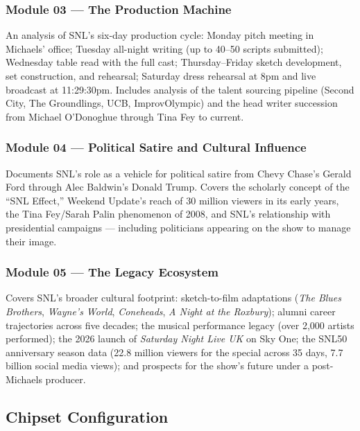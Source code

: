 \documentclass[11pt,letterpaper]{article}
\begin{document}
\subsubsection{Module 03 --- The Production Machine}
An analysis of SNL's six-day production cycle: Monday pitch meeting in Michaels' office; Tuesday all-night writing (up to 40--50 scripts submitted); Wednesday table read with the full cast; Thursday--Friday sketch development, set construction, and rehearsal; Saturday dress rehearsal at 8pm and live broadcast at 11:29:30pm. Includes analysis of the talent sourcing pipeline (Second City, The Groundlings, UCB, ImprovOlympic) and the head writer succession from Michael O'Donoghue through Tina Fey to current.

\subsubsection{Module 04 --- Political Satire and Cultural Influence}
Documents SNL's role as a vehicle for political satire from Chevy Chase's Gerald Ford through Alec Baldwin's Donald Trump. Covers the scholarly concept of the ``SNL Effect,'' Weekend Update's reach of 30 million viewers in its early years, the Tina Fey/Sarah Palin phenomenon of 2008, and SNL's relationship with presidential campaigns --- including politicians appearing on the show to manage their image.

\subsubsection{Module 05 --- The Legacy Ecosystem}
Covers SNL's broader cultural footprint: sketch-to-film adaptations (\textit{The Blues Brothers}, \textit{Wayne's World}, \textit{Coneheads}, \textit{A Night at the Roxbury}); alumni career trajectories across five decades; the musical performance legacy (over 2,000 artists performed); the 2026 launch of \textit{Saturday Night Live UK} on Sky One; the SNL50 anniversary season data (22.8 million viewers for the special across 35 days, 7.7 billion social media views); and prospects for the show's future under a post-Michaels producer.

\subsection{Chipset Configuration}
\end{document}
